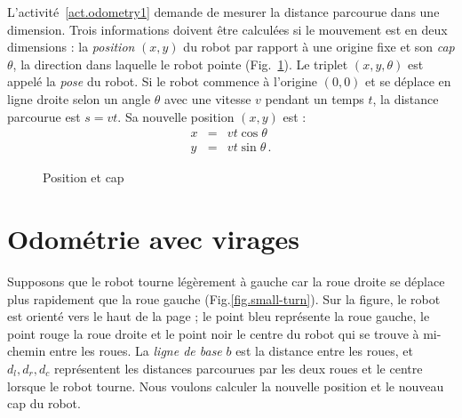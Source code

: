 L'activité~\ref{act.odometry1} demande de mesurer la distance parcourue dans une dimension. Trois informations doivent être calculées si le mouvement est en deux dimensions : la \emph{position} $(x,y)$ du robot par rapport à une origine fixe et son \emph{cap} $\theta$, la direction dans laquelle le robot pointe (Fig.~\ref{fig.pos-head}). Le triplet $(x,y,\theta)$ est appelé la \emph{pose} du robot. Si le robot commence à l'origine $(0,0)$ et se déplace en ligne droite selon un angle $\theta$ avec une vitesse $v$ pendant un temps $t$, la distance parcourue est $s=vt$. Sa nouvelle position $(x,y)$ est :
\begin{eqnarray*}
x &=& vt \cos \theta\\
y &=& vt \sin \theta\,.
\end{eqnarray*}

\begin{figure}
\begin{center}
\caption{Position et cap}\label{fig.pos-head}
\end{center}
\end{figure}


\section{Odométrie avec virages}\label{s.odometry-turns}

Supposons que le robot tourne légèrement à gauche car la roue droite se déplace plus rapidement que la roue gauche (Fig.\ref{fig.small-turn}). Sur la figure, le robot est orienté vers le haut de la page ; le point bleu représente la roue gauche, le point rouge la roue droite et le point noir le centre du robot qui se trouve à mi-chemin entre les roues. La \textit{ligne de base} $b$ est la distance entre les roues, et $d_l, d_r, d_c$ représentent les distances parcourues par les deux roues et le centre lorsque le robot tourne. Nous voulons calculer la nouvelle position et le nouveau cap du robot.

